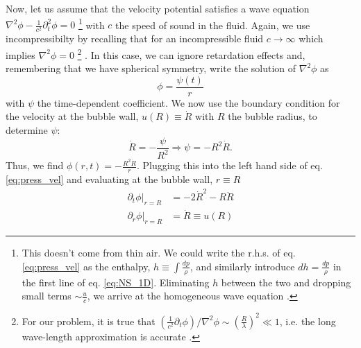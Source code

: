 \documentclass[rmp,aps,nofootinbib,superscriptaddress,floatfix,10pt]{revtex4-2}
\begin{document}
Now, let us assume that the velocity potential satisfies a wave equation $\nabla^2 \phi - \frac{1}{c^2}\partial_t^2 \phi =0 $ \footnote{This doesn't come from thin air. We could write the r.h.s. of eq. \ref{eq:press_vel} as the enthalpy, $h\equiv \int \frac{dp}{\rho}$, and similarly introduce $dh=\frac{dp}{\rho}$ in the first line of eq. \ref{eq:NS_1D}. Eliminating $h$ between the two and dropping small terms $\sim \frac{u}{c}$, we arrive at the homogeneous wave equation \cite{leighton2007derivation,brenner2002single,prosperetti1999old}.} with $c$ the speed of sound in the fluid. Again, we use incompressibilty by recalling that for an incompressible fluid $c\rightarrow \infty$ which implies $\nabla^2 \phi =0$ \footnote{For our problem, it is true that $\left( \frac{1}{c^2} \partial_t \phi \right) / \nabla^2 \phi \sim \left( \frac{R}{\lambda} \right)^2 \ll 1$, i.e. the long wave-length approximation is accurate \cite{prosperetti1999old,prosperetti1986bubble,leighton2007derivation}.} . In this case, we can ignore retardation effects and, remembering that we have spherical symmetry, write the solution of $\nabla^2 \phi$ as 
\begin{equation}
    \phi = \frac{\psi(t)}{r}
\end{equation}
with $\psi$ the time-dependent coefficient. We now use the boundary condition for the velocity at the bubble wall, $u(R)\equiv \dot{R}$ with $R$ the bubble radius, to determine $\psi$:
\begin{equation}
    \dot{R} = -\frac{\psi}{R^2} \Rightarrow \psi = -R^2 \dot{R}.
\end{equation}  
Thus, we find $\phi(r,t) = -\frac{R^2 \dot{R}}{r}$. Plugging this into the left hand side of eq. \ref{eq:press_vel} and evaluating at the bubble wall, $r\equiv R$
\begin{equation}
\begin{split}
    \partial_t \phi \vert_{r=R} & = -2\dot{R}^2-R\ddot{R} \\
    \partial_r \phi \vert_{r=R} & = \dot{R} \equiv u(R)
\end{split}
\end{equation}
\end{document}
